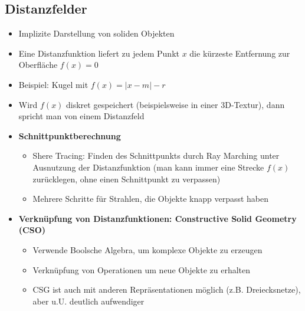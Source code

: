 \subsection{Distanzfelder}
\begin{itemize}
	\item Implizite Darstellung von soliden Objekten
	\item Eine Distanzfunktion liefert zu jedem Punkt \(x\) die kürzeste Entfernung zur Oberfläche \(f(x) = 0\)
	\item Beispiel: Kugel mit \(f(x) = |x-m|-r\)
	\item Wird \(f(x)\) diskret gespeichert (beispielsweise in einer 3D-Textur), dann spricht man von einem Distanzfeld
	\item \textbf{Schnittpunktberechnung}
	\begin{itemize}
		\item Shere Tracing: Finden des Schnittpunkts durch Ray Marching unter Ausnutzung der Distanzfunktion (man kann immer eine Strecke \(f(x)\) zurücklegen, ohne einen Schnittpunkt zu verpassen)
		\item Mehrere Schritte für Strahlen, die Objekte knapp verpasst haben
	\end{itemize}
	\item \textbf{Verknüpfung von Distanzfunktionen: Constructive Solid Geometry (CSO)}
	\begin{itemize}
		\item Verwende Boolsche Algebra, um komplexe Objekte zu erzeugen
		\item Verknüpfung von Operationen um neue Objekte zu erhalten
		\item CSG ist auch mit anderen Repräsentationen möglich (z.B. Dreiecksnetze), aber u.U. deutlich aufwendiger
	\end{itemize}
\end{itemize}


